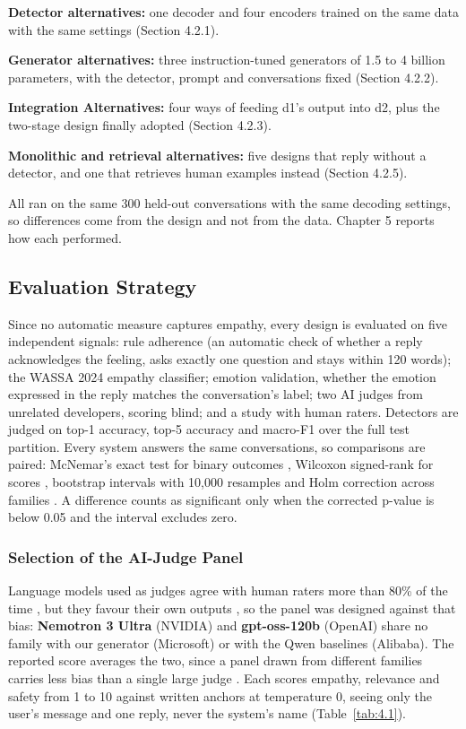 \textbf{Detector alternatives:} one decoder and four encoders trained on the same data with the same settings (Section 4.2.1).

\textbf{Generator alternatives: }three instruction-tuned generators of 1.5 to 4 billion parameters, with the detector, prompt and conversations fixed (Section 4.2.2).

\textbf{Integration Alternatives:} four ways of feeding d1's output into d2, plus the two-stage design finally adopted (Section 4.2.3).

\textbf{Monolithic and retrieval alternatives:} five designs that reply without a detector, and one that retrieves human examples instead (Section 4.2.5).

All ran on the same 300 held-out conversations with the same decoding settings, so differences come from the design and not from the data. Chapter 5 reports how each performed.

\subsection{Evaluation Strategy}

Since no automatic measure captures empathy, every design is evaluated on five independent signals: rule adherence (an automatic check of whether a reply acknowledges the feeling, asks exactly one question and stays within 120 words); the WASSA 2024 empathy classifier; emotion validation, whether the emotion expressed in the reply matches the conversation's label; two AI judges from unrelated developers, scoring blind; and a study with human raters. Detectors are judged on top-1 accuracy, top-5 accuracy and macro-F1 over the full test partition. Every system answers the same conversations, so comparisons are paired: McNemar's exact test for binary outcomes \cite{mcnemar1947}, Wilcoxon signed-rank for scores \cite{wilcoxon1945}, bootstrap intervals with 10,000 resamples \cite{efron1993} and Holm correction across families \cite{holm1979}. A difference counts as significant only when the corrected p-value is below 0.05 and the interval excludes zero.

\subsubsection{Selection of the AI-Judge Panel}

Language models used as judges agree with human raters more than 80\% of the time \cite{zheng2023judge}, but they favour their own outputs \cite{panickssery2024}, so the panel was designed against that bias: \textbf{Nemotron 3 Ultra} (NVIDIA) and \textbf{gpt-oss-120b }(OpenAI) share no family with our generator (Microsoft) or with the Qwen baselines (Alibaba). The reported score averages the two, since a panel drawn from different families carries less bias than a single large judge \cite{verga2024}. Each scores empathy, relevance and safety from 1 to 10 against written anchors at temperature 0, seeing only the user's message and one reply, never the system's name (Table~\ref{tab:4.1}).

